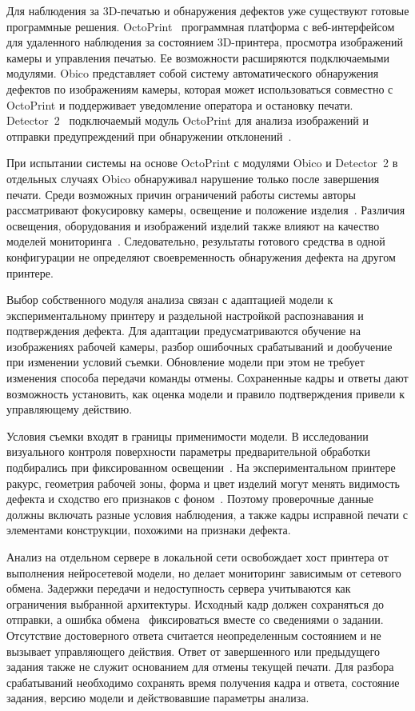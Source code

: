 Для наблюдения за 3D-печатью и обнаружения дефектов уже существуют готовые программные решения. OctoPrint~\textemdash{} программная платформа с веб-интерфейсом для удаленного наблюдения за состоянием 3D-принтера, просмотра изображений камеры и управления печатью. Ее возможности расширяются подключаемыми модулями. Obico представляет собой систему автоматического обнаружения дефектов по изображениям камеры, которая может использоваться совместно с OctoPrint и поддерживает уведомление оператора и остановку печати. Detector~2~\textemdash{} подключаемый модуль OctoPrint для анализа изображений и отправки предупреждений при обнаружении отклонений~\cite{gabstur2024detection}.

При испытании системы на основе OctoPrint с модулями Obico и Detector~2 в отдельных случаях Obico обнаруживал нарушение только после завершения печати. Среди возможных причин ограничений работы системы авторы рассматривают фокусировку камеры, освещение и положение изделия~\cite{gabstur2024detection}. Различия освещения, оборудования и изображений изделий также влияют на качество моделей мониторинга~\cite{zhang2024domain}. Следовательно, результаты готового средства в одной конфигурации не определяют своевременность обнаружения дефекта на другом принтере.

Выбор собственного модуля анализа связан с адаптацией модели к экспериментальному принтеру и раздельной настройкой распознавания и подтверждения дефекта. Для адаптации предусматриваются обучение на изображениях рабочей камеры, разбор ошибочных срабатываний и дообучение при изменении условий съемки. Обновление модели при этом не требует изменения способа передачи команды отмены. Сохраненные кадры и ответы дают возможность установить, как оценка модели и правило подтверждения привели к управляющему действию.

Условия съемки входят в границы применимости модели. В исследовании визуального контроля поверхности параметры предварительной обработки подбирались при фиксированном освещении~\cite{измайлов2020анализ}. На экспериментальном принтере ракурс, геометрия рабочей зоны, форма и цвет изделий могут менять видимость дефекта и сходство его признаков с фоном~\cite{gabstur2024detection,zhang2024domain}. Поэтому проверочные данные должны включать разные условия наблюдения, а также кадры исправной печати с элементами конструкции, похожими на признаки дефекта.

Анализ на отдельном сервере в локальной сети освобождает хост принтера от выполнения нейросетевой модели, но делает мониторинг зависимым от сетевого обмена. Задержки передачи и недоступность сервера учитываются как ограничения выбранной архитектуры. Исходный кадр должен сохраняться до отправки, а ошибка обмена~\textemdash{} фиксироваться вместе со сведениями о задании. Отсутствие достоверного ответа считается неопределенным состоянием и не вызывает управляющего действия. Ответ от завершенного или предыдущего задания также не служит основанием для отмены текущей печати. Для разбора срабатываний необходимо сохранять время получения кадра и ответа, состояние задания, версию модели и действовавшие параметры анализа.

